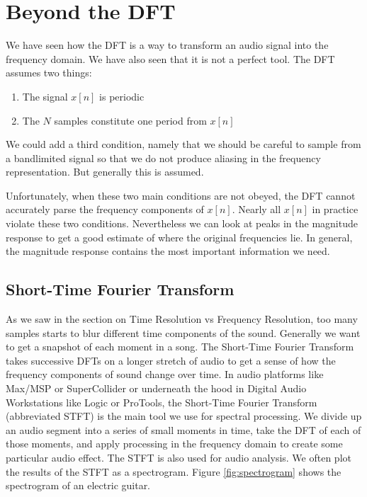\section*{Beyond the DFT}

We have seen how the DFT is a way to transform an audio signal into the frequency domain.  We have also
seen that it is not a perfect tool.  The DFT assumes two things:

\begin{enumerate}
	\item The signal $x[n]$ is periodic
	\item The $N$ samples constitute one period from $x[n]$
\end{enumerate}

We could add a third condition, namely that we should be careful to sample from a bandlimited signal so
that we do not produce aliasing in the frequency representation.  But generally this is assumed.  

Unfortunately, when these two main conditions are not obeyed, the DFT cannot accurately parse the frequency
components of $x[n]$.  Nearly all $x[n]$ in practice violate these two conditions.  Nevertheless we can look at
peaks in the magnitude response to get a good estimate of where the original frequencies lie.  In general, the
magnitude response contains the most important information we need. 

\subsection*{Short-Time Fourier Transform}

As we saw in the section on Time Resolution vs Frequency Resolution, too many samples starts to blur 
different time components of the sound.  Generally we want to get a snapshot of each moment in a song.
The Short-Time Fourier Transform takes successive DFTs on a longer stretch of audio to get a sense of
how the frequency components of sound change over time.  In audio platforms like Max/MSP or SuperCollider
or underneath the hood in Digital Audio Workstations like Logic or ProTools, the Short-Time Fourier Transform
(abbreviated STFT) is the main tool we use for spectral processing.  We divide up an audio segment into
a series of small moments in time, take the DFT of each of those moments, and apply processing in the 
frequency domain to create some particular audio effect.  The STFT is also used for audio analysis.  We often
plot the results of the STFT as a spectrogram.  Figure \ref{fig:spectrogram} shows the spectrogram of an electric guitar.

